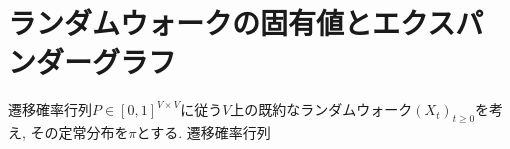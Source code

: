 \section{ランダムウォークの固有値とエクスパンダーグラフ}
遷移確率行列$P \in [0,1]^{V \times V}$に従う$V$上の既約なランダムウォーク$(X_t)_{t\ge 0}$を考え,
その定常分布を$\pi$とする.
遷移確率行列
